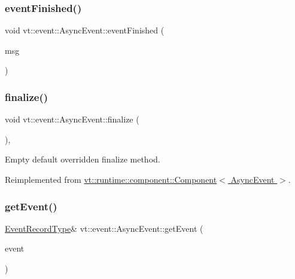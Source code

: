 \subsubsection{\texorpdfstring{event\+Finished()}{eventFinished()}}
{\footnotesize\ttfamily void vt\+::event\+::\+Async\+Event\+::event\+Finished (\begin{DoxyParamCaption}\item[{\hyperlink{structvt_1_1_event_finished_msg}{Event\+Finished\+Msg} $\ast$}]{msg }\end{DoxyParamCaption})\hspace{0.3cm}{\ttfamily [static]}}

\mbox{\label{structvt_1_1event_1_1_async_event_a77e3aafaae98603825556cdf8105ba57}} 
\subsubsection{\texorpdfstring{finalize()}{finalize()}}
{\footnotesize\ttfamily void vt\+::event\+::\+Async\+Event\+::finalize (\begin{DoxyParamCaption}{ }\end{DoxyParamCaption})\hspace{0.3cm}{\ttfamily [override]}, {\ttfamily [virtual]}}



Empty default overridden finalize method. 



Reimplemented from \hyperlink{structvt_1_1runtime_1_1component_1_1_component_a098e362de01af6054e5491fba671a959}{vt\+::runtime\+::component\+::\+Component$<$ Async\+Event $>$}.

\mbox{\label{structvt_1_1event_1_1_async_event_a78e777586ef948a4436b8dcea3c33be4}} 
\subsubsection{\texorpdfstring{get\+Event()}{getEvent()}}
{\footnotesize\ttfamily \hyperlink{structvt_1_1event_1_1_async_event_a5b4ef37db6e5962fdc0e6e0e56e74bc1}{Event\+Record\+Type}\& vt\+::event\+::\+Async\+Event\+::get\+Event (\begin{DoxyParamCaption}\item[{\hyperlink{namespacevt_a009267401def7ae8bf201892222d060f}{Event\+Type} const \&}]{event }\end{DoxyParamCaption})}



